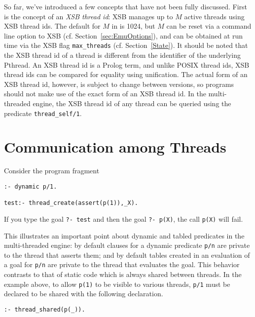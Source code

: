 So far, we've introduced a few concepts that have not been fully
discussed.  First is the concept of an {\em XSB thread id}: XSB
manages up to $M$ active threads using XSB thread ids.  The default
for $M$ in \version{} is 1024, but $M$ can be reset via a command line
option to XSB (cf. Section~\ref{sec:EmuOptions}), and can be obtained
at run time via the XSB flag {\tt max\_threads}
(cf. Section~\ref{State}).  It should be noted that the XSB thread id
of a thread is different from the identifier of the underlying
Pthread.  An XSB thread id is a Prolog term, and unlike POSIX thread
ids, XSB thread ids can be compared for equality using unification.
The actual form of an XSB thread id, however, is subject to change
between versions, so programs should not make use of the exact form of
an XSB thread id.  In the multi-threaded engine, the XSB thread id of
any thread can be queried using the predicate {\tt thread\_self/1}.

\section{Communication among Threads}

\begin{example}
Consider the program fragment
%
\begin{verbatim}
:- dynamic p/1.

test:- thread_create(assert(p(1)),_X).
\end{verbatim}
If you type the goal {\tt ?- test} and then the goal {\tt ?- p(X)},
the call {\tt p(X)} will fail.  
\end{example}

\noindent
This illustrates an important point about dynamic and tabled
predicates in the multi-threaded engine: by default clauses for a
dynamic predicate {\tt p/n} are private to the thread that asserts
them; and by default tables created in an evaluation of a goal for
{\tt p/n} are private to the thread that evaluates the goal.  This
behavior contrasts to that of static code which is always shared
between threads.  In the example above, to allow {\tt p(1)} to be
visible to various threads, {\tt p/1} must be declared to be shared
with the following declaration.
%
\begin{verbatim}
:- thread_shared(p(_)).
\end{verbatim}

